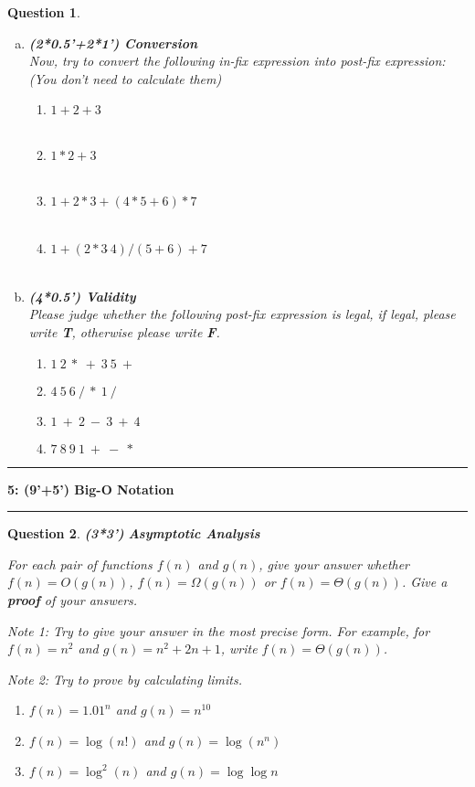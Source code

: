 \documentclass[10.5pt]{article}
\newcommand\question[2]{\vspace{.25in}\hrule\textbf{#1: #2}\vspace{.5em}\hrule\vspace{.10in}}
\newtheorem{Q}{Question}
\begin{document}
\begin{Q}
\begin{enumerate}[(a)]
		\item \textbf{(2*0.5'+2*1') Conversion}\\
		Now, try to convert the following in-fix expression into post-fix expression: (You don't need to calculate them)\\
		\begin{enumerate}[1) ]
			\item $ 1+2+3 $\\
			\\
			\item $ 1*2+3 $\\
			\\
			\item $ 1 + 2*3 + (4 * 5 + 6) * 7 $\\
			\\
			\item $ 1 + (2*3  \hat\   4) /(5+6)+7$\\
			\\
		\end{enumerate}
		\item \textbf{(4*0.5') Validity}\\
		Please judge whether the following post-fix expression is legal, if legal, please write \textbf{T}, otherwise please write \textbf{F}.
		\begin{enumerate}
			\item $ 1\ 2\ *\ +\ 3\ 5\ +\ $
			\item $ 4\ 5\ 6\ /\ *\ 1\ /\ $
			\item $ 1\ +\ 2\ -\ 3\ +\ 4\ $
			\item $ 7\ 8\ 9\ 1\ +\ -\ *\ $
		\end{enumerate}
	\end{enumerate}
	\end{Q}
	\pagebreak


\question{5}{(9'+5') Big-O Notation}
\begin{Q}
 \textbf{(3*3')} \textbf{Asymptotic Analysis}
 
For each pair of functions $f(n)$ and $g(n)$, give your answer whether $f(n) = O(g(n))$, $f(n) = \Omega(g(n))$ or $f(n) = \Theta(g(n))$.  Give a \textbf{proof} of your answers. 
\vspace{0.1cm}

Note 1: Try to give your answer in the most precise form. For example, for $f(n) = n^2$ and $g(n) = n^2 + 2n + 1$, write $f(n) = \Theta(g(n))$. 

Note 2: Try to prove by calculating limits.


\begin{enumerate}
    \item $f(n) = {1.01}^n$ and $g(n) = n^{10}$
    \vspace{4cm}
    \item $f(n) = \log(n!)$ and $g(n) = \log(n^n)$
    \vspace{4cm}
    \item $f(n) = {\log}^2(n)$ and $g(n) = \log \log n$ 
    \vspace{4cm}
    
\end{enumerate}
\end{Q}
\pagebreak
\end{document}
